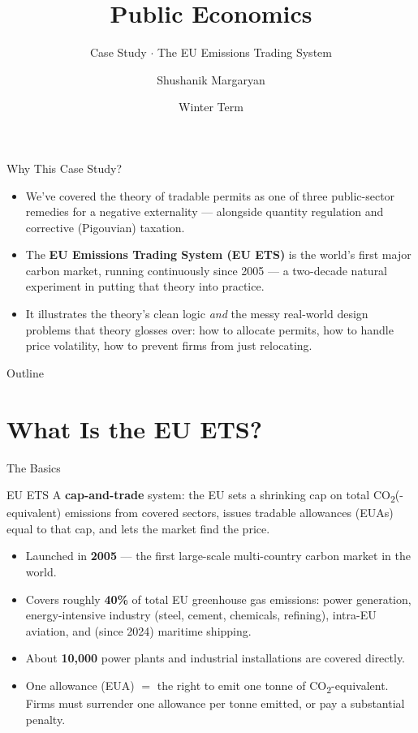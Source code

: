 \documentclass[11pt,aspectratio=169]{beamer}
\title{Public Economics}
\subtitle{Case Study \(\cdot\) The EU Emissions Trading System}
\author{Shushanik Margaryan}
\institute{WU Vienna University of Economics and Business}
\date{Winter Term}
\begin{document}
\begin{frame}
  \titlepage
\end{frame}

\begin{frame}{Why This Case Study?}
  \begin{itemize}
    \item We've covered the theory of tradable permits as one of three public-sector remedies for a negative externality --- alongside quantity regulation and corrective (Pigouvian) taxation.
    \item The \textbf{EU Emissions Trading System (EU ETS)} is the world's first major carbon market, running continuously since 2005 --- a two-decade natural experiment in putting that theory into practice.
    \item It illustrates the theory's clean logic \emph{and} the messy real-world design problems that theory glosses over: how to allocate permits, how to handle price volatility, how to prevent firms from just relocating.
  \end{itemize}
\end{frame}

\begin{frame}{Outline}
  \tableofcontents
\end{frame}

\section{What Is the EU ETS?}

\begin{frame}{The Basics}
  \begin{block}{EU ETS}
    A \textbf{cap-and-trade} system: the EU sets a shrinking cap on total CO\textsubscript{2}(-equivalent) emissions from covered sectors, issues tradable allowances (EUAs) equal to that cap, and lets the market find the price.
  \end{block}
  \begin{itemize}
    \item Launched in \textbf{2005} --- the first large-scale multi-country carbon market in the world.
    \item Covers roughly \textbf{40\%} of total EU greenhouse gas emissions: power generation, energy-intensive industry (steel, cement, chemicals, refining), intra-EU aviation, and (since 2024) maritime shipping.
    \item About \textbf{10,000} power plants and industrial installations are covered directly.
    \item One allowance (EUA) $=$ the right to emit one tonne of CO\textsubscript{2}-equivalent. Firms must surrender one allowance per tonne emitted, or pay a substantial penalty.
  \end{itemize}
\end{frame}
\end{document}
